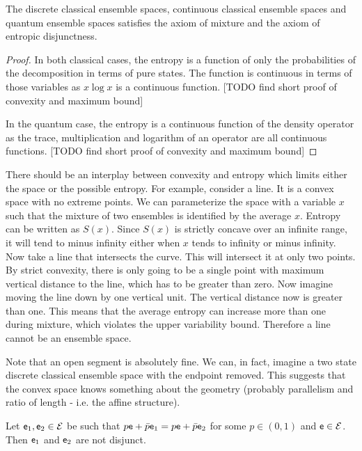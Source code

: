 \begin{prop}
	The discrete classical ensemble spaces, continuous classical ensemble spaces and quantum ensemble spaces satisfies the axiom of mixture and the axiom of entropic disjunctness.
\end{prop}

\begin{proof}
	In both classical cases, the entropy is a function of only the probabilities of the decomposition in terms of pure states. The function is continuous in terms of those variables as $x \log x$ is a continuous function. [TODO find short proof of convexity and maximum bound]
	
	In the quantum case, the entropy is a continuous function of the density operator as the trace, multiplication and logarithm of an operator are all continuous functions. [TODO find short proof of convexity and maximum bound]
\end{proof}

\begin{remark}
	There should be an interplay between convexity and entropy which limits either the space or the possible entropy. For example, consider a line. It is a convex space with no extreme points. We can parameterize the space with a variable $x$ such that the mixture of two ensembles is identified by the average $x$. Entropy can be written as $S(x)$. Since $S(x)$ is strictly concave over an infinite range, it will tend to minus infinity either when $x$ tends to infinity or minus infinity. Now take a line that intersects the curve. This will intersect it at only two points. By strict convexity, there is only going to be a single point with maximum vertical distance to the line, which has to be greater than zero. Now imagine moving the line down by one vertical unit. The vertical distance now is greater than one. This means that the average entropy can increase more than one during mixture, which violates the upper variability bound. Therefore a line cannot be an ensemble space.
	
	Note that an open segment is absolutely fine. We can, in fact, imagine a two state discrete classical ensemble space with the endpoint removed. This suggests that the convex space knows something about the geometry (probably parallelism and ratio of length - i.e. the affine structure).
\end{remark}

\begin{conj}
	Let $\mathsf{e}_1, \mathsf{e}_2 \in \mathcal{E}$ be such that $p\mathsf{e} + \bar{p} \mathsf{e}_1 = p\mathsf{e} + \bar{p} \mathsf{e}_2$ for some $p \in (0, 1)$ and $\mathsf{e} \in \mathcal{E}$. Then $\mathsf{e}_1$ and $\mathsf{e}_2$ are not disjunct.
\end{conj}

